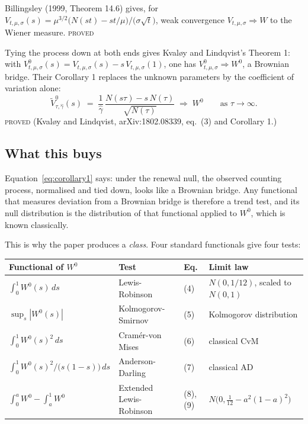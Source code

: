 \documentclass[11pt,a4paper]{article}
\newcommand{\Vtilde}{\widetilde{V}^{0}_{\tau,\hat\gamma}}
\newcommand{\Wbridge}{W^{0}}
\newcommand{\gh}{\hat\gamma}
\newcommand{\Ntau}{N(\tau)}
\newcommand{\PROVED}{\textsc{\textcolor{blue!55!black}{proved}}}
\begin{document}
Billingsley (1999, Theorem 14.6) gives, for
$V_{t,\mu,\sigma}(s) = \mu^{3/2}\bigl(N(st) - st/\mu\bigr)/\bigl(\sigma\sqrt{t}\bigr)$,
weak convergence $V_{t,\mu,\sigma} \Rightarrow W$ to the Wiener measure. \PROVED

Tying the process down at both ends gives Kvaløy and Lindqvist's Theorem 1: with
$V^0_{t,\mu,\sigma}(s) = V_{t,\mu,\sigma}(s) - s\,V_{t,\mu,\sigma}(1)$, one has
$V^0_{t,\mu,\sigma} \Rightarrow \Wbridge$, a Brownian bridge. Their Corollary 1 replaces
the unknown parameters by the coefficient of variation alone:
%
\begin{equation}
\Vtilde(s) \;=\; \frac{1}{\gh}\,\frac{N(s\tau) - s\,\Ntau}{\sqrt{\Ntau}}
\;\Longrightarrow\; \Wbridge
\qquad\text{as } \tau \to \infty .
\label{eq:corollary1}
\end{equation}
\PROVED{} (Kvaløy and Lindqvist, arXiv:1802.08339, eq.~(3) and Corollary 1.)

\subsection{What this buys}

Equation~\eqref{eq:corollary1} says: under the renewal null, the observed counting
process, normalised and tied down, looks like a Brownian bridge. Any functional that
measures deviation from a Brownian bridge is therefore a trend test, and its null
distribution is the distribution of that functional applied to $\Wbridge$, which is
known classically.

This is why the paper produces a \emph{class}. Four standard functionals give four
tests:

\begin{center}
\small
\begin{tabular}{@{}llll@{}}
\toprule
\textbf{Functional of $\Wbridge$} & \textbf{Test} & \textbf{Eq.} & \textbf{Limit law}\\
\midrule
$\int_0^1 \Wbridge(s)\,ds$ & Lewis-Robinson & (4) & $N(0, 1/12)$, scaled to $N(0,1)$\\
$\sup_s |\Wbridge(s)|$ & Kolmogorov-Smirnov & (5) & Kolmogorov distribution\\
$\int_0^1 \Wbridge(s)^2\,ds$ & Cramér-von Mises & (6) & classical CvM\\
$\int_0^1 \Wbridge(s)^2 / \bigl(s(1-s)\bigr)\,ds$ & Anderson-Darling & (7) & classical AD\\
\midrule
$\int_0^a \Wbridge - \int_a^1 \Wbridge$ & Extended Lewis-Robinson & (8), (9) &
$N\bigl(0, \tfrac{1}{12} - a^2(1-a)^2\bigr)$\\
\bottomrule
\end{tabular}
\end{center}
\end{document}
